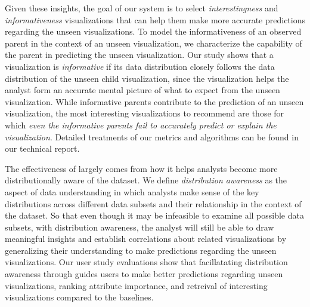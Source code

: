 \par Given these insights, the goal of our system is to select \textit{interestingness} and \textit{informativeness} visualizations that can help them make more accurate predictions regarding the unseen visualizations. To model the informativeness of an observed parent in the context of an unseen visualization, we characterize the capability of the parent in predicting the unseen visualization. Our study shows that a visualization is \emph{informative} if its data distribution closely follows the data distribution of the unseen child visualization, since the visualization helps the analyst form an accurate mental picture of what to expect from the unseen visualization. While informative parents contribute to the prediction of an unseen visualization, the most interesting visualizations to recommend are those for which \emph{even the informative parents fail to accurately predict or explain the visualization}. %
Detailed treatments of our metrics and algorithms can be found in our technical report. 
\par The effectiveness of \sbd largely comes from how it helps analysts become more distributionally aware of the dataset. We define \emph{distribution awareness} as the aspect of data understanding in which analysts make sense of the key distributions across different data subsets and their relationship in the context of the dataset. So that even though it may be infeasible to examine all possible data subsets, with distribution awareness, the analyst will still be able to draw meaningful insights and establish correlations about related visualizations by generalizing their understanding to make predictions regarding the unseen visualizations. Our user study evaluations show that facillatating distribution awareness through \sbd guides users to make better predictions regarding unseen visualizations, ranking attribute importance, and retreival of interesting visualizations compared to the baselines.
